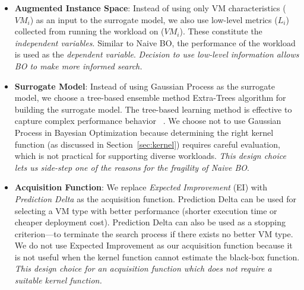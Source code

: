\begin{itemize}
\item \textbf{Augmented Instance Space}:
Instead of using only VM characteristics ($\mathit{VM}_i$) as an input to the surrogate model,
we also use low-level metrics ($L_i$) collected from running the workload on  ($\mathit{VM}_i$). These constitute the \textit{independent variables}. Similar to Naive BO, the performance of the workload is used as the \textit{dependent variable}.
\textit{Decision to use low-level information allows BO to  make more informed search.}

\item \textbf{Surrogate Model}: Instead of using Gaussian Process as the surrogate model, we choose a tree-based ensemble method Extra-Trees algorithm for building the surrogate model. The tree-based learning method is effective
to capture complex performance behavior
~\cite{Wang2004, Yin2006, Noorshams2013,Hsu2016, Yadwadkar2017}. We choose not to use Gaussian Process in Bayesian Optimization because determining the right kernel function (as discussed in Section~\ref{sec:kernel}) requires careful evaluation, which is not practical for supporting diverse workloads. \textit{This design choice lets us side-step one of the reasons for the fragility of Naive BO}.

\item \textbf{Acquisition Function}: We replace \textit{Expected Improvement} (EI) with \textit{Prediction Delta} as the acquisition function. 
Prediction Delta can be used for selecting a VM type with better performance (shorter execution time or cheaper deployment cost).
Prediction Delta can also be used as a stopping criterion---to terminate the search process if there exists no better VM type. We do not use Expected Improvement as our acquisition function because it is not useful when the kernel function cannot estimate the black-box function. \textit{This design choice for an acquisition function which does not require a suitable kernel function.}


\end{itemize}

